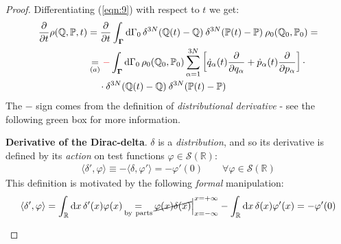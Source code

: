 \documentclass[../template.tex]{subfiles}
\begin{document}
\begin{proof}
    Differentiating (\ref{eqn:9}) with respect to $t$ we get:
    \begin{align}\nonumber
        \pdv{t} \rho(\mathbb{Q},\mathbb{P},t) &= \pdv{t} \int_{\bm{\Gamma}} \dd{\Gamma_0} \delta^{3N}(\mathbb{Q}(t)-\mathbb{Q}) \> \delta^{3N}(\mathbb{P}(t)-\mathbb{P}) \> \rho_0(\mathbb{Q}_0,\mathbb{P}_0) =\\ \nonumber
        &\underset{(a)}{=}  \textcolor{Red}{-} \int_{\bm{\Gamma}} \dd{\Gamma_0} \rho_0(\mathbb{Q}_0, \mathbb{P}_0) \sum_{\alpha=1}^{3N} \left[\dot{q}_\alpha(t) \pdv{q_\alpha} + \dot{p}_\alpha(t) \pdv{p_\alpha}\right] \cdot  \\
        &\quad\> \cdot \delta^{3N}(\mathbb{Q}(t) - \mathbb{Q}) \> \delta^{3N}(\mathbb{P}(t) - \mathbb{P}) \label{eqn:10}
    \end{align}
    The $-$ sign comes from the definition of \textit{distributional derivative} - see the following green box for more information. 

    \begin{expl}\textbf{Derivative of the Dirac-delta}. 
    $\delta$ is a \textit{distribution}, and so its derivative is defined by its \textit{action} on test functions $\varphi \in \mathcal{S}(\mathbb{R})$:
    \begin{align*}
        \langle \delta', \varphi \rangle \equiv - \langle \delta, \varphi' \rangle = -\varphi'(0) \qquad \forall \varphi \in \mathcal{S}(\mathbb{R})
    \end{align*}  
    This definition is motivated by the following \textit{formal} manipulation:
    \begin{align*}
        \langle \delta', \varphi \rangle = \int_{\mathbb{R}} \dd{x} \delta'(x) \varphi(x) \quad\underset{\mathclap{\rm{by\ parts}}}{=}\quad \cancel{ \varphi(x) \delta(x) }\Big|_{x=-\infty}^{x=+\infty} - \int_{\mathbb{R}} \dd{x} \delta(x)  \varphi'(x) = -\varphi'(0)
    \end{align*} 


\end{expl}
\end{proof}
\end{document}
